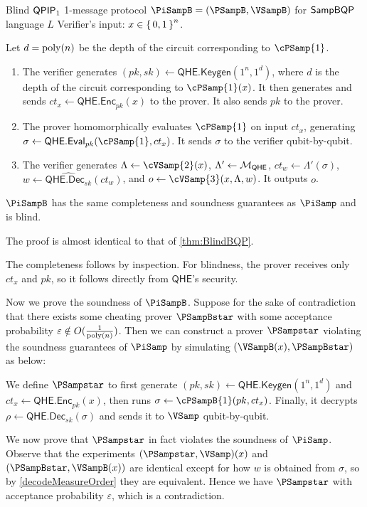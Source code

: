 \begin{protocol}{Blind $\operatorname{\mathsf{QPIP}}_1$ 1-message protocol $\PiSampB = (\PSampB, \VSampB)$ for $\operatorname{\mathsf{SampBQP}}$ language $L$}
	\label{proto:BlindSampBQP}
	Verifier's input: $x\in\set{0,1}^n$.
	
	Let $d=\operatorname*{\operatorname{poly}}(n)$ be the depth of the circuit corresponding to $\cPSamp{1}$.
	\begin{enumerate}
		\item The verifier generates $(pk, sk)\leftarrow\mathsf{QHE.Keygen}(1^n, 1^d)$, where $d$ is the depth of the circuit corresponding to $\cPSamp{1}(x)$.
			It then generates and sends $ct_x\leftarrow\mathsf{QHE.Enc}_{pk}(x)$ to the prover.
			It also sends $pk$ to the prover.
		\item The prover homomorphically evaluates $\cPSamp{1}$ on input $ct_x$, generating $\sigma\leftarrow\QEval_{pk}(\cPSamp{1}, ct_x)$.
			It sends $\sigma$ to the verifier qubit-by-qubit.
		\item The verifier generates $\Lambda\leftarrow\cVSamp{2}(x)$,
			$\Lambda'\leftarrow{\cal M}_{\mathsf{QHE}}$,
			$ct_w\leftarrow\Lambda'(\sigma)$,
			$w\leftarrow\widehat{\mathsf{QHE.Dec}_{sk}}(ct_w)$,
			and $o\leftarrow\cVSamp{3}(x, \Lambda, w)$.
			It outputs $o$.
	\end{enumerate}
\end{protocol}

\begin{thm}
	$\PiSampB$ has the same completeness and soundness guarantees as $\PiSamp$ and is blind.
\end{thm}
\begin{prf}
	The proof is almost identical to that of \cref{thm:BlindBQP}.

	The completeness follows by inspection.
	For blindness, the prover receives only $ct_x$ and $pk$, so it follows directly from $\mathsf{QHE}$'s security.
	
	Now we prove the soundness of $\PiSampB$.
	Suppose for the sake of contradiction that there exists some cheating prover $\PSampBstar$ with some acceptance probability $\varepsilon\notin O(\frac{1}{\operatorname*{\operatorname{poly}}(n)})$.
	Then we can construct a prover $\PSampstar$ violating the soundness guarantees of $\PiSamp$ by simulating $(\VSampB(x), \PSampBstar)$ as below:

	We define $\PSampstar$ to first generate
	$(pk, sk)\leftarrow\mathsf{QHE.Keygen}(1^n, 1^d)$
	and
	$ct_x\leftarrow\mathsf{QHE.Enc}_{pk}(x)$,
	then runs $\sigma\leftarrow\cPSampB{1}(pk, ct_x)$.
	Finally, it decrypts
	$\rho\leftarrow\mathsf{QHE.Dec}_{sk}(\sigma)$
	and sends it to $\VSamp$ qubit-by-qubit.

	We now prove that $\PSampstar$ in fact violates the soundness of $\PiSamp$.
	Observe that the experiments $(\PSampstar, \VSamp)(x)$ and $(\PSampBstar, \VSampB(x))$ are identical except for how $w$ is obtained from $\sigma$,
	so by \cref{decodeMeasureOrder} they are equivalent.
	Hence we have $\PSampstar$ with acceptance probability $\varepsilon$, which is a contradiction.
\end{prf}
